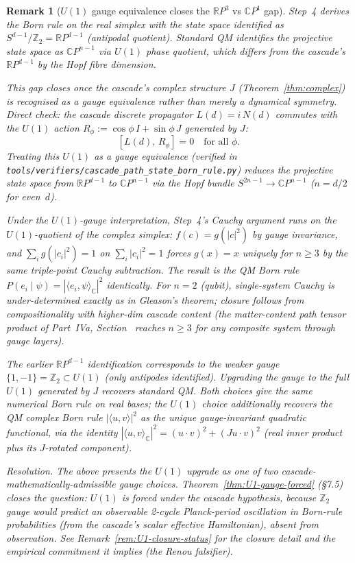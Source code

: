 \documentclass[12pt,a4paper]{article}
\newtheorem{remark}[theorem]{Remark}
\begin{document}
\begin{remark}[$U(1)$ gauge equivalence closes the
$\mathbb{R}P^3$ vs $\mathbb{C}P^1$ gap]\label{rem:U1-gauge-Born}
Step~4 derives the Born rule on the real simplex with the state space
identified as $S^{d-1}/\mathbb{Z}_2 = \mathbb{R}P^{d-1}$ (antipodal
quotient). Standard QM identifies the projective state space as
$\mathbb{C}P^{n-1}$ via $U(1)$ phase quotient, which differs from
the cascade's $\mathbb{R}P^{d-1}$ by the Hopf fibre dimension.

This gap closes once the cascade's complex structure $J$
(Theorem~\ref{thm:complex}) is recognised as a gauge equivalence
rather than merely a dynamical symmetry. Direct check: the cascade
discrete propagator $L(d) = i\,N(d)$ commutes with the $U(1)$ action
$R_\phi := \cos\phi\,I + \sin\phi\,J$ generated by $J$:
\[
[L(d),\,R_\phi] = 0 \quad\text{for all $\phi$.}
\]
Treating this $U(1)$ as a gauge equivalence (verified in
\texttt{tools/\allowbreak verifiers/\allowbreak cascade\_\allowbreak path\_\allowbreak state\_\allowbreak born\_\allowbreak rule.py})
reduces the projective state space from $\mathbb{R}P^{d-1}$ to
$\mathbb{C}P^{n-1}$ via the Hopf bundle $S^{2n-1} \to \mathbb{C}P^{n-1}$
($n = d/2$ for even~$d$).

Under the $U(1)$-gauge interpretation, Step~4's Cauchy argument runs
on the $U(1)$-quotient of the complex simplex:
$f(c) = g(|c|^2)$ by gauge invariance, and $\sum_i g(|c_i|^2) = 1$
on $\sum_i |c_i|^2 = 1$ forces $g(x) = x$ uniquely for $n \geq 3$
by the same triple-point Cauchy subtraction. The result is the
QM Born rule $P(e_i \mid \psi) = |\langle e_i, \psi\rangle_{\mathbb{C}}|^2$
identically. For $n = 2$ (qubit), single-system Cauchy is
under-determined exactly as in Gleason's theorem; closure follows
from compositionality with higher-dim cascade content (the
matter-content path tensor product of Part~IVa, Section~ reaches
$n \geq 3$ for any composite system through gauge layers).

The earlier $\mathbb{R}P^{d-1}$ identification corresponds to the
weaker gauge $\{1, -1\} = \mathbb{Z}_2 \subset U(1)$ (only antipodes
identified). Upgrading the gauge to the full $U(1)$
generated by $J$ recovers standard QM. Both choices give the
same numerical Born rule on real bases; the $U(1)$ choice
additionally recovers the QM complex Born rule
$|\langle u, v\rangle|^2$ as the
unique gauge-invariant quadratic functional, via the identity
$|\langle u, v\rangle_{\mathbb{C}}|^2 = (u\cdot v)^2 + (Ju\cdot v)^2$
(real inner product plus its $J$-rotated component).

\medskip
\noindent\textit{Resolution.} The above presents the $U(1)$ upgrade as
one of two cascade-mathematically-admissible gauge choices.
Theorem~\ref{thm:U1-gauge-forced} (\S7.5) closes the question:
$U(1)$ is forced under the cascade hypothesis, because $\mathbb{Z}_2$
gauge would predict an observable 2-cycle Planck-period oscillation
in Born-rule probabilities (from the cascade's scalar effective
Hamiltonian), absent from observation. See
Remark~\ref{rem:U1-closure-status} for the closure detail and the
empirical commitment it implies (the Renou falsifier).
\end{remark}
\end{document}
